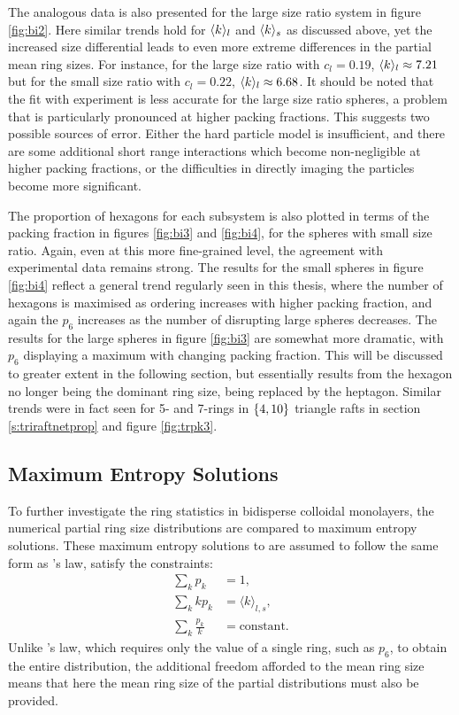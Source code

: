 The analogous data is also presented for the large size ratio system in figure \ref{fig:bi2}.
Here similar trends hold for $\langle k \rangle_l$ and $\langle k \rangle_s$ as discussed %
above, yet the increased size differential leads to even more extreme differences in the partial mean ring sizes.
For instance, for the large size ratio with $c_l=0.19$, $\langle k \rangle_l\approx7.21$ but for the small size ratio with $c_l=0.22$, $\langle k \rangle_l\approx6.68$.
It should be noted that the fit with experiment is less accurate for the large size ratio spheres, a problem that is particularly pronounced at higher packing fractions.
This suggests two possible sources of error.
Either the hard particle model is insufficient, and there are some additional short range interactions which become non\--negligible at higher packing fractions, or the difficulties in directly imaging the particles become more significant. 

The proportion of hexagons for each subsystem is also plotted in terms of the packing fraction in figures \ref{fig:bi3} and \ref{fig:bi4}, for the spheres with small size ratio.
Again, even at this more fine\--grained level, the agreement with experimental data remains strong.
The results for the small spheres in figure \ref{fig:bi4} reflect a general trend regularly seen in this thesis, where the number of hexagons is maximised as ordering increases with higher packing fraction, and again the $p_6$ increases as the number of disrupting large spheres decreases.
The results for the large spheres in figure \ref{fig:bi3} are somewhat more dramatic, with $p_6$ displaying a maximum with changing packing fraction.
This will be discussed to greater extent in the following section, but essentially results from the hexagon no longer being the dominant ring size, being replaced by the heptagon.
Similar trends were in fact seen for 5\-- and 7\--rings in $\left\{4,10\right\}$ triangle rafts in section \ref{s:triraftnetprop} and figure \ref{fig:trpk3}. 

\subsection{Maximum Entropy Solutions}

To further investigate the ring statistics in bidisperse colloidal monolayers, the numerical partial ring size distributions are compared to maximum entropy solutions.
These maximum entropy solutions to are assumed to follow the same form as \lm's law, \ie{} satisfy the constraints:
\begin{align}
	\sum_k p_k &= 1, \\
	\sum_k kp_k &= \langle k \rangle_{l,s}, \\
	\sum_k \frac{p_k}{k} &= \text{constant}.
\end{align}
Unlike \lm's law, which requires only the value of a single ring, such as $p_6$, to obtain the entire distribution, the additional freedom afforded to the mean ring size means that here the mean ring size of the partial distributions must also be provided.

